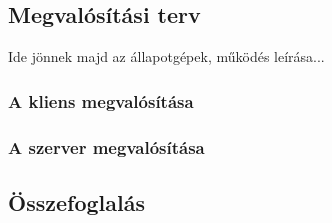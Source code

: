 \subsection{Megvalósítási terv}
\label{sec:megvalositas}

Ide jönnek majd az állapotgépek, működés leírása...

\subsubsection{A kliens megvalósítása}

\subsubsection{A szerver megvalósítása}
\label{sec:szervermegvalositas}


\subsection{Összefoglalás}

